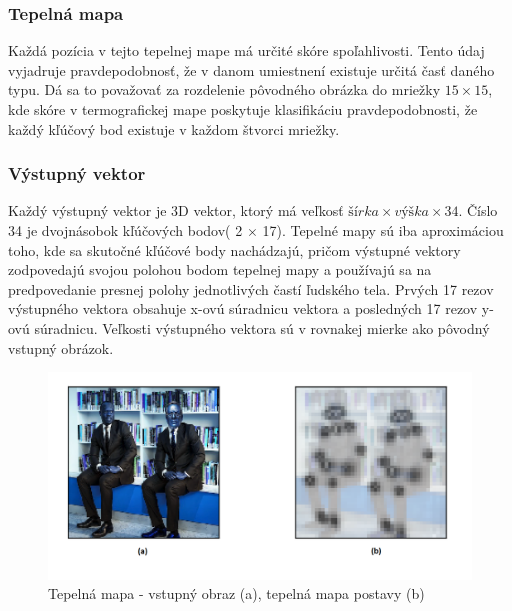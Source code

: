 \documentclass[slovak,master,dept460,male,cpp,cpdeclaration]{diploma}
\begin{document}
\subsubsection{Tepelná mapa}
Každá pozícia v tejto tepelnej mape má určité skóre spoľahlivosti. Tento údaj vyjadruje pravdepodobnosť, že v danom umiestnení existuje určitá časť daného typu. Dá sa to považovať za rozdelenie pôvodného obrázka do mriežky \textit{$15\times 15$}, kde skóre v termografickej mape poskytuje klasifikáciu pravdepodobnosti, že každý kľúčový bod existuje v každom štvorci mriežky.

\subsubsection{Výstupný vektor}
Každý výstupný vektor je 3D vektor, ktorý má veľkosť \textit{$šírka  \times výška \times 34$}. Číslo 34 je dvojnásobok kľúčových bodov( 2 $\times$ 17). Tepelné mapy sú iba aproximáciou toho, kde sa skutočné kľúčové body nachádzajú, pričom výstupné vektory zodpovedajú svojou polohou bodom tepelnej mapy a používajú sa na predpovedanie presnej polohy jednotlivých častí ľudského tela. Prvých 17 rezov výstupného vektora obsahuje x-ovú súradnicu vektora a posledných 17 rezov y-ovú súradnicu. Veľkosti výstupného vektora sú v rovnakej mierke ako pôvodný vstupný obrázok.

\begin{figure}[H]
	\centering
	\includegraphics[width=1\textwidth]{Figures/tfPose1.png}
	\caption{Tepelná mapa  - vstupný obraz (a), tepelná mapa postavy (b)}
	\label{fig:tfPoseHeatmap}
\end{figure}
\end{document}
